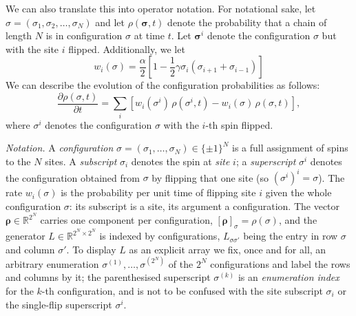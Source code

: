 \documentclass[12pt]{article}
\newcommand{\R}{\mathbb{R}}
\newcommand{\brho}{\boldsymbol{\rho}}
\theoremstyle{definition}
\theoremstyle{remark}
\begin{document}
We can also translate this into operator notation. For notational sake, let $\sigma = (\sigma_1, \sigma_2, \dots, \sigma_N)$ and let $\rho(\boldsymbol{\sigma}, t)$ denote the probability that a chain of length $N$ is in configuration $\sigma$ at time $t$. Let $\boldsymbol{\sigma}^i$ denote the configuration $\sigma$ but with the site $i$ flipped. Additionally, we let
\[
w_i(\sigma) = \frac{\alpha}{2} \left[1 - \frac{1}{2}\gamma \sigma_i( \sigma_{i+1} + \sigma_{i-1})\right]
\]
We can describe the evolution of the configuration probabilities as follows:
\[
\frac{\partial \rho(\sigma, t)}{\partial t} = \sum_i \left[ w_i(\sigma^i)\, \rho(\sigma^i, t) - w_i(\sigma)\, \rho(\sigma, t) \right],
\]
where $\sigma^i$ denotes the configuration $\sigma$ with the $i$-th spin flipped. 

\emph{Notation.} A \emph{configuration} $\sigma = (\sigma_1, \dots, \sigma_N) \in \{\pm 1\}^N$ is a full assignment of spins to the $N$ sites. A \emph{subscript} $\sigma_i$ denotes the spin at \emph{site} $i$; a \emph{superscript} $\sigma^i$ denotes the configuration obtained from $\sigma$ by flipping that one site (so $(\sigma^i)^i = \sigma$). The rate $w_i(\sigma)$ is the probability per unit time of flipping site $i$ given the whole configuration $\sigma$: its subscript is a site, its argument a configuration. The vector $\brho \in \R^{2^N}$ carries one component per configuration, $[\brho]_\sigma = \rho(\sigma)$, and the generator $L \in \R^{2^N \times 2^N}$ is indexed by configurations, $L_{\sigma\sigma'}$ being the entry in row $\sigma$ and column $\sigma'$. To display $L$ as an explicit array we fix, once and for all, an arbitrary enumeration $\sigma^{(1)}, \dots, \sigma^{(2^N)}$ of the $2^N$ configurations and label the rows and columns by it; the parenthesised superscript $\sigma^{(k)}$ is an \emph{enumeration index} for the $k$-th configuration, and is not to be confused with the site subscript $\sigma_i$ or the single-flip superscript $\sigma^i$.
\end{document}
